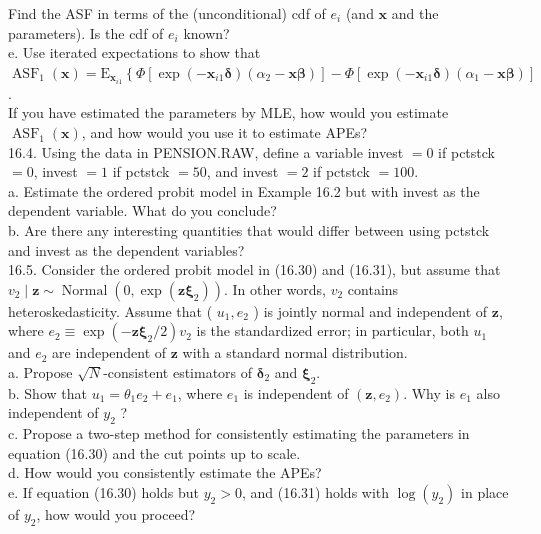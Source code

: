 \documentclass[10pt]{article}
\begin{document}
Find the ASF in terms of the (unconditional) cdf of $e_{i}$ (and $\mathbf{x}$ and the parameters). Is the cdf of $e_{i}$ known?\\
e. Use iterated expectations to show that\\
$\operatorname{ASF}_{1}(\mathbf{x})=\mathrm{E}_{\mathbf{x}_{i 1}}\left\{\Phi\left[\exp \left(-\mathbf{x}_{i 1} \boldsymbol{\delta}\right)\left(\alpha_{2}-\mathbf{x} \boldsymbol{\beta}\right)\right]-\Phi\left[\exp \left(-\mathbf{x}_{i 1} \boldsymbol{\delta}\right)\left(\alpha_{1}-\mathbf{x} \boldsymbol{\beta}\right)\right]\right.$.\\
If you have estimated the parameters by MLE, how would you estimate $\operatorname{ASF}_{1}(\mathbf{x})$, and how would you use it to estimate APEs?\\
16.4. Using the data in PENSION.RAW, define a variable invest $=0$ if pctstck $=0$, invest $=1$ if pctstck $=50$, and invest $=2$ if pctstck $=100$.\\
a. Estimate the ordered probit model in Example 16.2 but with invest as the dependent variable. What do you conclude?\\
b. Are there any interesting quantities that would differ between using pctstck and invest as the dependent variables?\\
16.5. Consider the ordered probit model in (16.30) and (16.31), but assume that $v_{2} \mid \mathbf{z} \sim \operatorname{Normal}\left(0, \exp \left(\mathbf{z} \boldsymbol{\xi}_{2}\right)\right)$. In other words, $v_{2}$ contains heteroskedasticity. Assume that ( $u_{1}, e_{2}$ ) is jointly normal and independent of $\mathbf{z}$, where $e_{2} \equiv \exp \left(-\mathbf{z} \boldsymbol{\xi}_{2} / 2\right) v_{2}$ is the standardized error; in particular, both $u_{1}$ and $e_{2}$ are independent of $\mathbf{z}$ with a standard normal distribution.\\
a. Propose $\sqrt{N}$-consistent estimators of $\boldsymbol{\delta}_{2}$ and $\boldsymbol{\xi}_{2}$.\\
b. Show that $u_{1}=\theta_{1} e_{2}+e_{1}$, where $e_{1}$ is independent of $\left(\mathbf{z}, e_{2}\right)$. Why is $e_{1}$ also independent of $y_{2}$ ?\\
c. Propose a two-step method for consistently estimating the parameters in equation (16.30) and the cut points up to scale.\\
d. How would you consistently estimate the APEs?\\
e. If equation (16.30) holds but $y_{2}>0$, and (16.31) holds with $\log \left(y_{2}\right)$ in place of $y_{2}$, how would you proceed?\\
\end{document}
